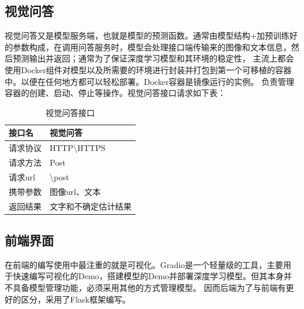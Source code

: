\subsection{视觉问答}
视觉问答又是模型服务端，也就是模型的预测函数。通常由模型结构+加预训练好的参数构成，在调用问答服务时，模型会处理接口端传输来的图像和文本信息，然后预测输出并返回；通常为了保证深度学习模型和其环境的稳定性，
主流上都会使用Docker组件对模型以及所需要的环境进行封装并打包到第一个可移植的容器中。以便在任何地方都可以轻松部署。Docker容器是镜像运行的实例。
负责管理容器的创建、启动、停止等操作。视觉问答接口请求如下表：
\begin{table}
    \caption{\label{tab:linkvqa}视觉问答接口}
    \centering
    \small
    \begin{tabular}{l|l}
        \hline 接口名 & 视觉问答 \\
        \hline 请求协议 & HTTP\textbackslash HTTPS \\
		请求方法 & Post \\
		请求url & \textbackslash post \\
		携带参数 & 图像url、文本 \\
		返回结果 & 文字和不确定估计结果 \\
        \hline
        \end{tabular}
\end{table}	

\subsection{前端界面}
在前端的编写使用中最注重的就是可视化。Gradio是一个轻量级的工具，主要用于快速编写可视化的Demo，搭建模型的Demo并部署深度学习模型。但其本身并不具备模型管理功能，必须采用其他的方式管理模型。
因而后端为了与前端有更好的区分，采用了Flask框架编写。

